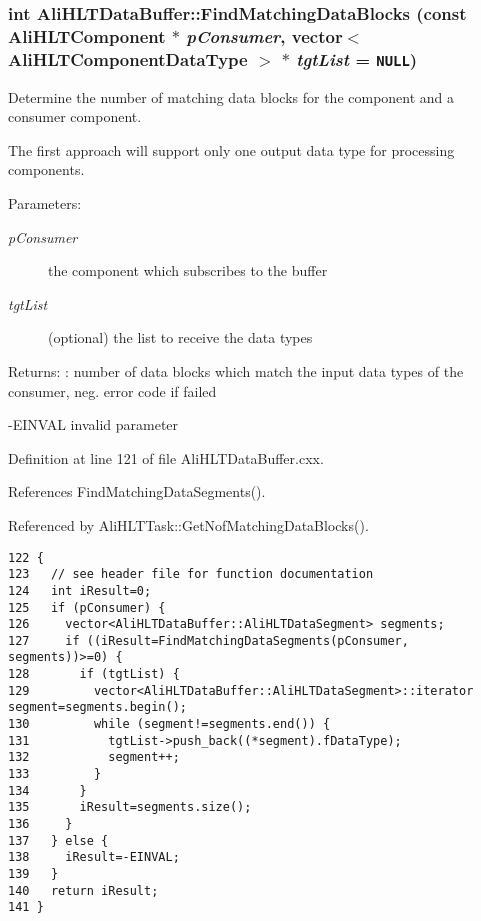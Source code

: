 \subsubsection{\setlength{\rightskip}{0pt plus 5cm}int Ali\-HLTData\-Buffer::Find\-Matching\-Data\-Blocks (const {\bf Ali\-HLTComponent} $\ast$ {\em p\-Consumer}, vector$<$ {\bf Ali\-HLTComponent\-Data\-Type} $>$ $\ast$ {\em tgt\-List} = {\tt NULL})}\label{classAliHLTDataBuffer_a5}


Determine the number of matching data blocks for the component and a consumer component. \par
 The first approach will support only one output data type for processing components. \begin{Desc}
\item[Parameters:]
\begin{description}
\item[{\em p\-Consumer}]the component which subscribes to the buffer \item[{\em tgt\-List}](optional) the list to receive the data types \end{description}
\end{Desc}
\begin{Desc}
\item[Returns:]: number of data blocks which match the input data types of the consumer, neg. error code if failed \par
 -EINVAL invalid parameter \par
 \end{Desc}


Definition at line 121 of file Ali\-HLTData\-Buffer.cxx.

References Find\-Matching\-Data\-Segments().

Referenced by Ali\-HLTTask::Get\-Nof\-Matching\-Data\-Blocks().

\footnotesize\begin{verbatim}122 {
123   // see header file for function documentation
124   int iResult=0;
125   if (pConsumer) {
126     vector<AliHLTDataBuffer::AliHLTDataSegment> segments;
127     if ((iResult=FindMatchingDataSegments(pConsumer, segments))>=0) {
128       if (tgtList) {
129         vector<AliHLTDataBuffer::AliHLTDataSegment>::iterator segment=segments.begin();
130         while (segment!=segments.end()) {
131           tgtList->push_back((*segment).fDataType);
132           segment++;
133         }
134       }
135       iResult=segments.size();
136     }
137   } else {
138     iResult=-EINVAL;
139   }
140   return iResult;
141 }
\end{verbatim}\normalsize 


